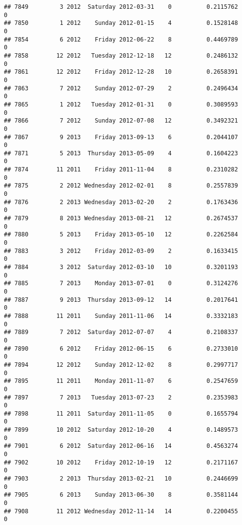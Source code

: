 \documentclass[
]{article}
\begin{document}
\begin{verbatim}
## 7849         3 2012  Saturday 2012-03-31    0          0.2115762             0
## 7850         1 2012    Sunday 2012-01-15    4          0.1528148             0
## 7854         6 2012    Friday 2012-06-22    8          0.4469789             0
## 7858        12 2012   Tuesday 2012-12-18   12          0.2486132             0
## 7861        12 2012    Friday 2012-12-28   10          0.2658391             0
## 7863         7 2012    Sunday 2012-07-29    2          0.2496434             0
## 7865         1 2012   Tuesday 2012-01-31    0          0.3089593             0
## 7866         7 2012    Sunday 2012-07-08   12          0.3492321             0
## 7867         9 2013    Friday 2013-09-13    6          0.2044107             0
## 7871         5 2013  Thursday 2013-05-09    4          0.1604223             0
## 7874        11 2011    Friday 2011-11-04    8          0.2310282             0
## 7875         2 2012 Wednesday 2012-02-01    8          0.2557839             0
## 7876         2 2013 Wednesday 2013-02-20    2          0.1763436             0
## 7879         8 2013 Wednesday 2013-08-21   12          0.2674537             0
## 7880         5 2013    Friday 2013-05-10   12          0.2262584             0
## 7883         3 2012    Friday 2012-03-09    2          0.1633415             0
## 7884         3 2012  Saturday 2012-03-10   10          0.3201193             0
## 7885         7 2013    Monday 2013-07-01    0          0.3124276             0
## 7887         9 2013  Thursday 2013-09-12   14          0.2017641             0
## 7888        11 2011    Sunday 2011-11-06   14          0.3332183             0
## 7889         7 2012  Saturday 2012-07-07    4          0.2108337             0
## 7890         6 2012    Friday 2012-06-15    6          0.2733010             0
## 7894        12 2012    Sunday 2012-12-02    8          0.2997717             0
## 7895        11 2011    Monday 2011-11-07    6          0.2547659             0
## 7897         7 2013   Tuesday 2013-07-23    2          0.2353983             0
## 7898        11 2011  Saturday 2011-11-05    0          0.1655794             0
## 7899        10 2012  Saturday 2012-10-20    4          0.1489573             0
## 7901         6 2012  Saturday 2012-06-16   14          0.4563274             0
## 7902        10 2012    Friday 2012-10-19   12          0.2171167             0
## 7903         2 2013  Thursday 2013-02-21   10          0.2446699             0
## 7905         6 2013    Sunday 2013-06-30    8          0.3581144             0
## 7908        11 2012 Wednesday 2012-11-14   14          0.2200455             0

\end{verbatim}
\end{document}
